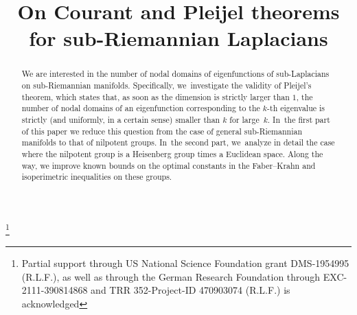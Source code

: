 \documentclass[JEP,XML,SOM,Unicode,published]{cedram}
\theoremstyle{definition}
\newcommand{\1}{\mathbbm{1}}
\begin{document}
\title[Pleijel theorem for sub-Laplacians]{On Courant and Pleijel theorems for sub-Riemannian Laplacians}

\author[\initial{R.} \middlename{L.} \lastname{Frank}]{  }
\address{Mathematisches Institut, Ludwig-Maximilians Universität München,\\
Theresienstr.~39, 80333 München, Germany}
\address{\& Munich Center for Quantum Science and Technology,\\
Schellingstr.~4, 80799 München, Germany}
\address{\& Mathematics 253-37, Caltech,\\
Pasadena, CA 91125, USA}

\author[\initial{B.} \lastname{Helffer}]{ }
\address{Laboratoire de Mathématiques Jean Leray, CNRS, Nantes Université,\\
F44000. Nantes, France}

\thanks{Partial support through US National Science Foundation grant DMS-1954995 (R.L.F.), as well as through the German Research Foundation through EXC-2111-390814868 and TRR 352-Project-ID 470903074 (R.L.F.) is acknowledged}

\begin{abstract}
We are interested in the number of nodal domains of eigenfunctions of sub-Laplacians on sub-Riemannian manifolds. Specifically, we~investigate the validity of Pleijel's theorem, which states that, as soon as the dimension is strictly larger than $1$, the number of nodal domains of an eigenfunction corresponding to the $k$-th eigenvalue is strictly (and uniformly, in a certain sense) smaller than $k$ for large~$k$. In~the first part of this paper we reduce this question from the case of general sub-Riemannian manifolds to that of nilpotent groups. In~the second part, we~analyze in detail the case where the nilpotent group is a Heisenberg group times a Euclidean space. Along the way, we improve known bounds on the optimal constants in the Faber--Krahn and isoperimetric inequalities on these groups.
\end{abstract}


\end{document}
